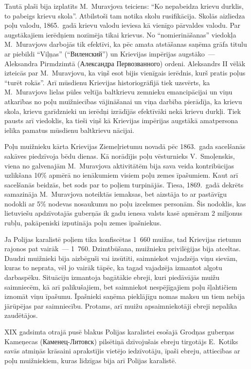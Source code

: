 \documentclass[twoside,a5paper,12pt,fleqn,openany]{extbook}
\newcommand{\rutxti}[1]{\textrussian{#1}}
\begin{document}
Tautā plaši bija izplatīts M.~Muravjova teiciens: ``Ko nepabeidza krievu durklis, to pabeigs krievu skola''. Atbilstoši tam notika skolu rusifikācija. Skolās aizliedza poļu valodu, 1865.~gadā krievu valodu ieviesa kā vienīgo pārvaldes valodu. Par augstākajiem ierēdņiem nozīmēja tikai krievus. No ``nomierināšanas'' viedokļa M.~Muravjovs darbojās tik efektīvi, ka pēc amata atstāšanas saņēma grāfa titulu ar piebildi ``Viļņas'' (``\rutxti{Виленский''}) un Krievijas impērijas augstāko~--- Aleksandra Pirmdzimtā (\rutxti{Александра Первозванного}) ordeni. Aleksandrs II vēlāk izteicās par M.~Muravjovu, ka viņš esot bijis vienīgais ierēdnis, kurš pratis poļus ``turēt rokās''. Arī mūsdienu Krievijas historiogrāfijā tiek uzsvērts, ka M.~Muravjovs lielas pūles veltīja baltkrievu zemnieku emancipācijai un viņu atkarības no poļu muižniecības vājināšanai un viņa darbība pierādīja, ka krievu skola, krievu garīdznieki un ierēdņi izrādījās efektīvāki nekā krievu durkļi. Tiek pausts arī viedoklis, ka tieši viņš kā Krievijas impērijas augstākā amatpersona ielika pamatus mūsdienu baltkrievu nācijai.

Poļu muižnieku kārta Krievijas Ziemeļrietumu novadā pēc 1863.~gada sacelšanās sakāves piedzīvoja bēdu dienas. Kā norādījis poļu vēsturnieks V.~Smoļenskis, viena no galvenajām M.~Muravjova aktivitātēm bija sava veida kontribūcijas uzlikšana 10\% apmērā no ienākumiem visiem poļu zemes īpašumiem. Kaut arī sacelšanās beidzās, bet sods par to poļiem turpinājās. Tiesa, 1869.~gadā dekrēts samazināja M.~Muravjova noteiktās iemaksas, bet aizstāja to ar pastāvīgu nodokli ar 5\% nodevas nosaukumu no poļu izcelsmes personām. Šis nodoklis, kas lietuviešu apdzīvotajās guberņās ik gadu ienesa valsts kasē apmēram 2 miljonus rubļu, pakāpeniski izputināja poļu zemes īpašniekus.

Ja Polijas karalistē poļiem tika konfiscētas 1~660 muižas, tad Krievijas rietumu rajonos pat vairāk~--- 1~760. Dzimtbūšana, muižnieku privilēģijas bija atceltas. Daudzi muižnieki bija aizbēguši vai izsūtīti, saimniekot vajadzēja viņu sievām, kuras to neprata, vēl jo vairāk tāpēc, ka tagad vajadzēja izmantot algotu darbaspēku. Situāciju izmantoja bagātākie ebreji, kuri piedāvājās muižu saimniecēm, kā arī palikušajiem, bet saimniekot nespējīgajiem poļu šļahtičiem iznomāt viņu īpašumu. Īpašnieki saņēma pieklājīgu nomas maksu un tiem nebija jārūpējas par saimniecību. Protams, arī muižu apsaimniekotāji ebreji nepalika zaudētājos.

XIX gadsimta otrajā pusē blakus Polijas karalistei esošajā Grodņas guberņas Kameņecas (\rutxti{Каменец-Литовск}) pilsētiņā dzīvojušais ebreju tirgotājs E.~Kotiks savās atmiņās krāsaini aprakstījis vietējo iedzīvotāju, īpaši ebreju, attiecības ar poļu muižniekiem, kuras līdzīgas bija arī Polijas karalistē.
\end{document}
